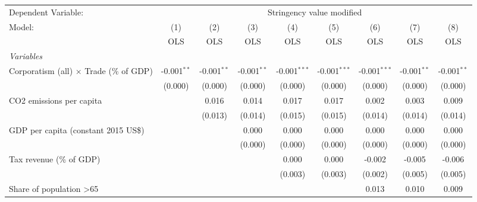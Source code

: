 
\begingroup
\centering
\begin{tabular}{lcccccccc}
   \toprule
   Dependent Variable: & \multicolumn{8}{c}{Stringency value modified}\\
   Model:                                         & (1)           & (2)           & (3)           & (4)            & (5)            & (6)            & (7)           & (8)\\  
                                                  &  OLS          & OLS           & OLS           & OLS            & OLS            & OLS            & OLS           & OLS\\  
   \midrule
   \emph{Variables}\\
   Corporatism (all) $\times$ Trade (\% of GDP)   & -0.001$^{**}$ & -0.001$^{**}$ & -0.001$^{**}$ & -0.001$^{***}$ & -0.001$^{***}$ & -0.001$^{***}$ & -0.001$^{**}$ & -0.001$^{**}$\\   
                                                  & (0.000)       & (0.000)       & (0.000)       & (0.000)        & (0.000)        & (0.000)        & (0.000)       & (0.000)\\   
   CO2 emissions per capita                       &               & 0.016         & 0.014         & 0.017          & 0.017          & 0.002          & 0.003         & 0.009\\   
                                                  &               & (0.013)       & (0.014)       & (0.015)        & (0.015)        & (0.014)        & (0.014)       & (0.014)\\   
   GDP per capita (constant 2015 US\$)            &               &               & 0.000         & 0.000          & 0.000          & 0.000          & 0.000         & 0.000\\   
                                                  &               &               & (0.000)       & (0.000)        & (0.000)        & (0.000)        & (0.000)       & (0.000)\\   
   Tax revenue (\% of GDP)                        &               &               &               & 0.000          & 0.000          & -0.002         & -0.005        & -0.006\\   
                                                  &               &               &               & (0.003)        & (0.003)        & (0.002)        & (0.005)       & (0.005)\\   
   Share of population >65                        &               &               &               &                &                & 0.013          & 0.010         & 0.009\\   

\end{tabular}
